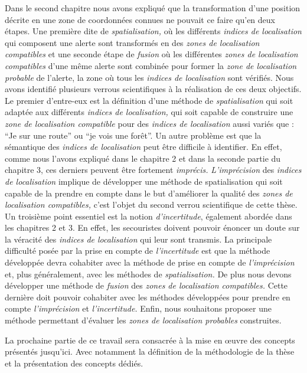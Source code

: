 Dans le second chapitre nous avons expliqué que la transformation
d'une position décrite en une zone de coordonnées connues ne pouvait
ce faire qu'en deux étapes. Une première dite de
\emph{spatialisation,} où les différents \emph{indices de
  localisation} qui composent une alerte sont transformés en des
\emph{zones de localisation compatibles} et une seconde étape de
\emph{fusion} où les différentes \emph{zones de localisation
  compatibles} d'une même alerte sont combinée pour former la
\emph{zone de localisation probable} de l'alerte, \ie la zone où tous
les \emph{indices de localisation} sont vérifiés. Nous avons identifié
plusieurs verrous scientifiques à la réalisation de ces deux
objectifs. Le premier d'entre-eux est la définition d'une méthode de
\emph{spatialisation} qui soit adaptée aux différents \emph{indices de
  localisation,} \ie qui soit capable de construire une \emph{zone de
  localisation compatible} pour des \emph{indices de localisation}
aussi variés que : \enquote{Je sur une route} ou \enquote{je vois une
  forêt}.  Un autre problème est que la sémantique des \emph{indices
  de localisation} peut être difficile à identifier. En effet, comme
nous l'avons expliqué dans le chapitre 2 et dans la seconde partie du
chapitre 3, ces derniers peuvent être fortement \emph{imprécis.}
\emph{L'imprécision} des \emph{indices de localisation} implique de
développer une méthode de spatialisation qui soit capable de la
prendre en compte dans le but d'améliorer la qualité des \emph{zones
  de localisation compatibles,} c'est l'objet du second verrou
scientifique de cette thèse.  Un troisième point essentiel est la
notion \emph{d'incertitude}, également abordée dans les chapitres 2 et
3. En effet, les secouristes doivent pouvoir énoncer un doute sur la
véracité des \emph{indices de localisation} qui leur sont transmis. La
principale difficulté posée par la prise en compte de
\emph{l'incertitude} est que la méthode développée devra cohabiter
avec la méthode de prise en compte de \emph{l'imprécision} et, plus
généralement, avec les méthodes de \emph{spatialisation.}  De plus
nous devons développer une méthode de \emph{fusion} des \emph{zones de
  localisation compatibles.} Cette dernière doit pouvoir cohabiter
avec les méthodes développées pour prendre en compte
\emph{l'imprécision} et \emph{l'incertitude.}  Enfin, nous souhaitons
proposer une méthode permettant d'évaluer les \emph{zones de
  localisation probables} construites.


La prochaine partie de ce travail sera consacrée à la mise en œuvre
des concepts présentés jusqu'ici. Avec notamment la définition de la
méthodologie de la thèse et la présentation des concepts dédiés.


